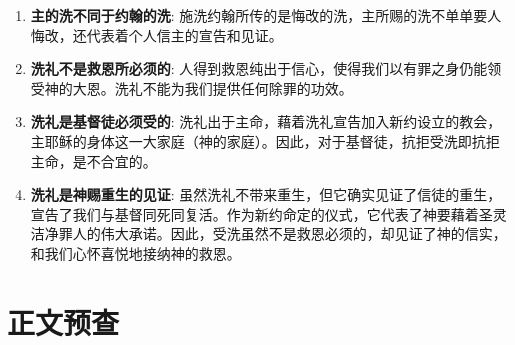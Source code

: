 \begin{enumerate}
  \begin{enumerate}
    \item \textbf{主的洗不同于约翰的洗}: 施洗约翰所传的是悔改的洗，主所赐的洗不单单要人悔改，还代表着个人信主的宣告和见证。
    \item \textbf{洗礼不是救恩所必须的}: 人得到救恩纯出于信心，使得我们以有罪之身仍能领受神的大恩。洗礼不能为我们提供任何除罪的功效。
    \item \textbf{洗礼是基督徒必须受的}: 洗礼出于主命，藉着洗礼宣告加入新约设立的教会，主耶稣的身体这一大家庭（神的家庭）。因此，对于基督徒，抗拒受洗即抗拒主命，是不合宜的。
    \item \textbf{洗礼是神赐重生的见证}: 虽然洗礼不带来重生，但它确实见证了信徒的重生，宣告了我们与基督同死同复活。作为新约命定的仪式，它代表了神要藉着圣灵洁净罪人的伟大承诺。因此，受洗虽然不是救恩必须的，却见证了神的信实，和我们心怀喜悦地接纳神的救恩。
  \end{enumerate}
\end{enumerate}

\section{正文预查}

